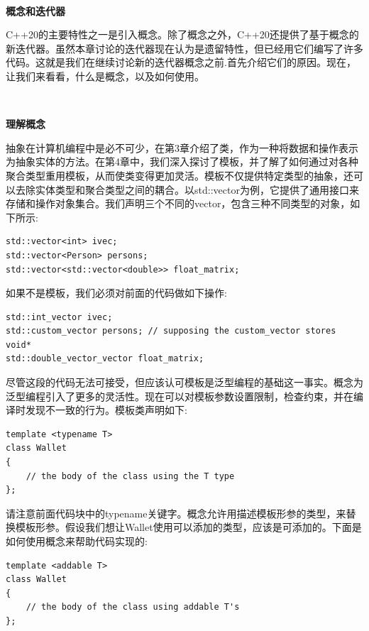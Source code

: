 \noindent\textbf{}\ \par
\textbf{概念和迭代器} \ \par
C++20的主要特性之一是引入概念。除了概念之外，C++20还提供了基于概念的新迭代器。虽然本章讨论的迭代器现在认为是遗留特性，但已经用它们编写了许多代码。这就是我们在继续讨论新的迭代器概念之前.首先介绍它们的原因。现在，让我们来看看，什么是概念，以及如何使用。 \par

\noindent\textbf{}\ \par
\textbf{理解概念} \ \par
抽象在计算机编程中是必不可少，在第3章介绍了类，作为一种将数据和操作表示为抽象实体的方法。在第4章中，我们深入探讨了模板，并了解了如何通过对各种聚合类型重用模板，从而使类变得更加灵活。模板不仅提供特定类型的抽象，还可以去除实体类型和聚合类型之间的耦合。以std::vector为例，它提供了通用接口来存储和操作对象集合。我们声明三个不同的vector，包含三种不同类型的对象，如下所示: \par

\begin{lstlisting}[caption={}]
std::vector<int> ivec;
std::vector<Person> persons;
std::vector<std::vector<double>> float_matrix;
\end{lstlisting}

如果不是模板，我们必须对前面的代码做如下操作: \par

\begin{lstlisting}[caption={}]
std::int_vector ivec;
std::custom_vector persons; // supposing the custom_vector stores void*
std::double_vector_vector float_matrix;
\end{lstlisting}

尽管这段的代码无法可接受，但应该认可模板是泛型编程的基础这一事实。概念为泛型编程引入了更多的灵活性。现在可以对模板参数设置限制，检查约束，并在编译时发现不一致的行为。模板类声明如下: \par

\begin{lstlisting}[caption={}]
template <typename T>
class Wallet
{
	// the body of the class using the T type
};
\end{lstlisting}

请注意前面代码块中的typename关键字。概念允许用描述模板形参的类型，来替换模板形参。假设我们想让Wallet使用可以添加的类型，应该是可添加的。下面是如何使用概念来帮助代码实现的: \par

\begin{lstlisting}[caption={}]
template <addable T>
class Wallet
{
	// the body of the class using addable T's
};
\end{lstlisting}

